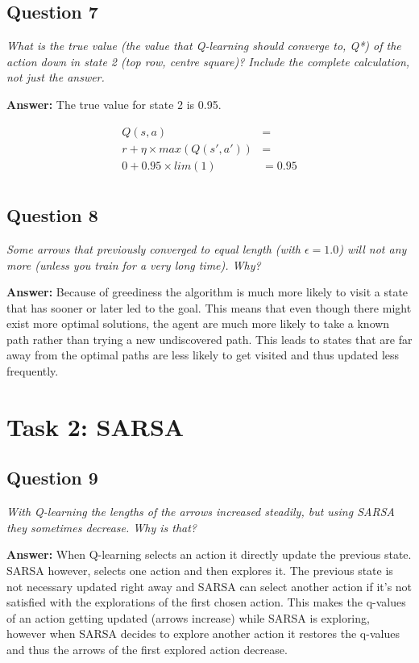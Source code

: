 \documentclass[a4paper]{article}
\begin{document}
\subsection*{Question 7}
\emph{What is the true value (the value that Q-learning should converge
to, Q*) of the action down in state 2 (top row, centre square)? Include the complete calculation, not just the answer.}

\textbf{Answer:} The true value for state 2 is 0.95.

\begin{align*}
Q(s, a)                    &= \\
r + \eta \times max(Q(s', a'))   &= \\
0 + 0.95 \times lim(1) &= 0.95 \\
\end{align*}

\subsection*{Question 8}
\emph{Some arrows that previously converged to equal length (with $\epsilon = 1.0$) will not any more (unless you train for a very long time). Why?}

\textbf{Answer:} Because of greediness the algorithm is much more likely to visit a state that has sooner or later led to the goal. This means that even though there might exist more optimal solutions, the agent are much more likely to take a known path rather than trying a new undiscovered path. 
This leads to states that are far away from the optimal paths are less likely to get visited and thus updated less frequently.

\section{Task 2: SARSA}

\subsection*{Question 9}
\emph{With Q-learning the lengths of the arrows increased steadily, but
using SARSA they sometimes decrease. Why is that?}

\textbf{Answer:} When Q-learning selects an action it directly update the previous state. SARSA however, selects one action and then explores it. The previous state is not necessary updated right away and SARSA can select another action if it's not satisfied with the explorations of the first chosen action. This makes the q-values of an action getting updated (arrows increase) while SARSA is exploring, however when SARSA decides to explore another action it restores the q-values and thus the arrows of the first explored action decrease.
\end{document}
